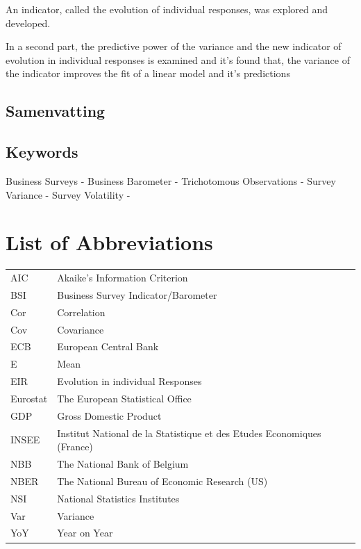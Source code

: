 \documentclass[12pt,a4paper,oneside]{book}
\begin{document}
An indicator, called the evolution of individual responses, was explored and developed.

In a second part, the predictive power of the variance and the new indicator of evolution in individual responses is examined and it's found that, the variance of the indicator improves the fit of a linear model and it's predictions


\section*{Samenvatting}


\section*{Keywords}
Business Surveys - 
Business Barometer -
Trichotomous Observations -
Survey Variance - 
Survey Volatility -


\chapter*{List of Abbreviations}

\begin{tabular}{l l}
  AIC       & Akaike's Information Criterion \\
  BSI       & Business Survey Indicator/Barometer \\
  Cor       & Correlation \\
  Cov       & Covariance \\
  ECB       & European Central Bank \\
  E         & Mean \\
  EIR       & Evolution in individual Responses \\
  Eurostat  & The European Statistical Office \\
  GDP       & Gross Domestic Product \\
  INSEE     & Institut National de la Statistique et des Etudes Economiques (France) \\
  NBB       & The National Bank of Belgium \\
  NBER      & The National Bureau of Economic Research (US) \\
  NSI       & National Statistics Institutes \\
  Var       & Variance \\
  YoY       & Year on Year \\
\end{tabular}
\end{document}
